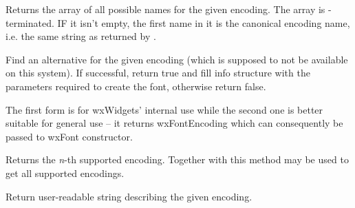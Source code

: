 \label{wxfontmappergetallencodingnames}


Returns the array of all possible names for the given encoding. The array is
\NULL-terminated. IF it isn't empty, the first name in it is the canonical
encoding name, i.e. the same string as returned by 
.


\label{wxfontmappergetaltforencoding}



Find an alternative for the given encoding (which is supposed to not be
available on this system). If successful, return true and fill info
structure with the parameters required to create the font, otherwise
return false.

The first form is for wxWidgets' internal use while the second one
is better suitable for general use -- it returns wxFontEncoding which
can consequently be passed to wxFont constructor.


\label{wxfontmappergetencoding}


Returns the {\it n}-th supported encoding. Together with 
this method may be used to get all supported encodings.


\label{wxfontmappergetencodingdescription}


Return user-readable string describing the given encoding.


\label{wxfontmappergetencodingfromname}


